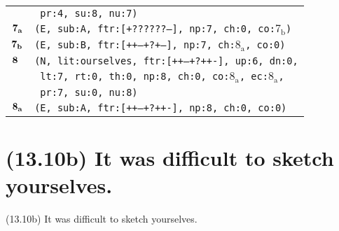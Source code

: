 \documentclass{article}
\begin{document}
\begin{minipage}{\textwidth}
{\begin{tabular}{|r|l|}
    & \texttt{\texttt{~pr:4,~su:8,~nu:7)}} \\
    ${\textbf{\textrm{7}}_{\textbf{\textrm{a}}}}$ & \texttt{\texttt{(E,~sub:A,~ftr:[+??????--],~np:7,~ch:0,~co:${\textrm{7}_{\textrm{b}}}$)}} \\
    ${\textbf{\textrm{7}}_{\textbf{\textrm{b}}}}$ & \texttt{\texttt{(E,~sub:B,~ftr:[++--+?+--],~np:7,~ch:${\textrm{8}_{\textrm{a}}}$,~co:0)}} \\
    ${\textbf{\textrm{8}}_{\phantom{z}}}$ & \texttt{\texttt{(N,~lit:ourselves,~ftr:[++--+?++-],~up:6,~dn:0,}} \\
    & \texttt{\texttt{~lt:7,~rt:0,~th:0,~np:8,~ch:0,~co:${\textrm{8}_{\textrm{a}}}$,~ec:${\textrm{8}_{\textrm{a}}}$,}} \\
    & \texttt{\texttt{~pr:7,~su:0,~nu:8)}} \\
    ${\textbf{\textrm{8}}_{\textbf{\textrm{a}}}}$ & \texttt{\texttt{(E,~sub:A,~ftr:[++--+?++-],~np:8,~ch:0,~co:0)}} \\
    \hline
  \end{tabular}
  }
\end{minipage}
\bigbreak

\clearpage

%
%

\section*{(13.10b) It was difficult to sketch yourselves.}

\bigbreak
\begin{enumerate*}
\item[(13.10b)] It was difficult to sketch yourselves.
\end{enumerate*}
\bigbreak
\end{document}

